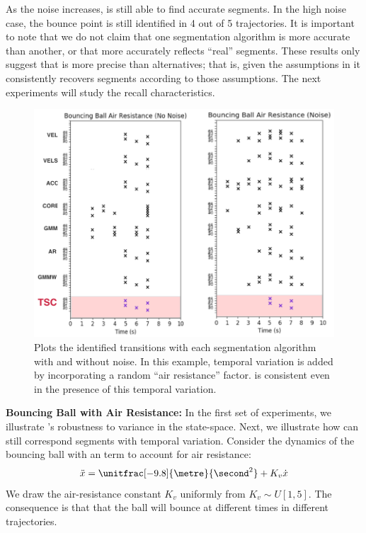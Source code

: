 As the noise increases, \tsc is still able to find accurate segments.
In the high noise case, the bounce point is still identified in 4 out of 5 trajectories.
It is important to note that we do not claim that one segmentation algorithm is more accurate than another, or that \tsc more accurately reflects ``real'' segments.
These results only suggest that \tsc is more precise than alternatives; that is, given the assumptions in \tsc it consistently recovers segments according to those assumptions.
The next experiments will study the recall characteristics.

\begin{figure}%
\centering
\includegraphics[width=\columnwidth]{tsc-experiments/ball-results2.png}
\caption{Plots the identified transitions with each segmentation algorithm with and without noise. In this example, temporal variation is added by incorporating a random ``air resistance'' factor.
\tsc is consistent even in the presence of this temporal variation. \label{ball-results2}}
\end{figure}

\textbf{Bouncing Ball with Air Resistance: }
In the first set of experiments, we illustrate \tsc's robustness to variance in the state-space.
Next, we illustrate how \tsc can still correspond segments with temporal variation.
Consider the dynamics of the bouncing ball with an term to account for air resistance:
\[ \ddot{x} = \unitfrac[-9.8]{\metre}{\second^2} + K_v \dot{x} \]
We draw the air-resistance constant $K_v$ uniformly from $K_v \sim U[1,5]$.
The consequence is that that the ball will bounce at different times in different trajectories.

